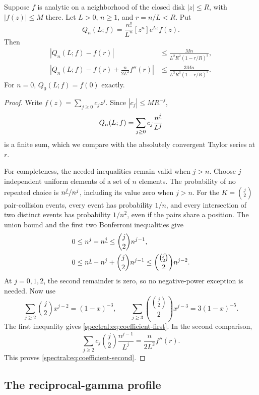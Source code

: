 \begin{lemma}\label{spectral:lem:coefficient}
Suppose \(f\) is analytic on a neighborhood of the closed disk
\(|z|\le R\), with \(|f(z)|\le M\) there. Let \(L>0\),
\(n\ge1\), and \(r=n/L<R\). Put
\[
Q_n(L;f)=\frac{n!}{L^n}[z^n]e^{Lz}f(z).
\]
Then
\begin{align}
|Q_n(L;f)-f(r)|
&\le\frac{Mn}{L^2R^2(1-r/R)^3},\label{spectral:eq:coefficient-first}\\
\left|Q_n(L;f)-f(r)+\frac{n}{2L^2}f''(r)\right|
&\le\frac{3Mn}{L^3R^3(1-r/R)^5}.\label{spectral:eq:coefficient-second}
\end{align}
For \(n=0\), \(Q_0(L;f)=f(0)\) exactly.
\end{lemma}

\begin{proof}
Write \(f(z)=\sum_{j\ge0}c_jz^j\). Since \(|c_j|\le MR^{-j}\),
\[
Q_n(L;f)=\sum_{j\ge0}c_j\frac{n^{\underline{j}}}{L^j}
\]
is a finite sum, which we compare with the absolutely convergent
Taylor series at \(r\).

For completeness, the needed inequalities remain valid when \(j>n\).
Choose \(j\) independent uniform elements of a set of \(n\) elements.
The probability of no repeated choice is
\(n^{\underline{j}}/n^j\), including its value zero when \(j>n\).
For the \(K=\binom j2\) pair-collision events, every event has
probability \(1/n\), and every intersection of two distinct events
has probability \(1/n^2\), even if the pairs share a position.
The union bound and the first two Bonferroni inequalities give
\begin{align*}
0&\le n^j-n^{\underline{j}}\le\binom j2 n^{j-1},\\
0&\le n^{\underline{j}}-n^j+\binom j2 n^{j-1}
 \le\binom{\binom j2}{2}n^{j-2}.
\end{align*}
At \(j=0,1,2\), the second remainder is zero, so no negative-power
exception is needed. Now use
\[
\sum_{j\ge2}\binom j2 x^{j-2}=(1-x)^{-3},
\qquad
\sum_{j\ge3}\binom{\binom j2}{2}x^{j-3}=3(1-x)^{-5}.
\]
The first inequality gives \eqref{spectral:eq:coefficient-first}.
In the second comparison,
\[
\sum_{j\ge2}c_j\binom j2\frac{n^{j-1}}{L^j}
=\frac{n}{2L^2}f''(r).
\]
This proves \eqref{spectral:eq:coefficient-second}.
\end{proof}

\subsection{The reciprocal-gamma profile}

